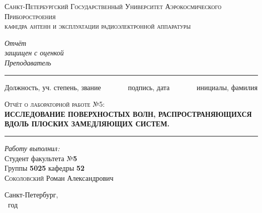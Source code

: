 \newcommand{\HRule}{\rule{\linewidth}{0.5mm}}
\begin{titlepage}
\begin{center}
\textsc{\large Санкт-Петербургский Государственный
Университет Аэрокосмического Приборостроения}\\[2cm]
\textsc{\large кафедра антенн и эксплуатации радиоэлектронной 
 аппаратуры}
\\[2cm]

 \begin{flushleft} \large
  \emph{Отчёт} \\
   \emph{защищен с оценкой}
   \\[0.5cm]
   \emph{Преподаватель}\\[-3mm]
   \HRule
\end{flushleft}
\begin{flushright}
\vspace{-6 pt}
{\small
Должность, уч. степень, звание
\ \ \ \ \ \ \
подпись, дата
\ \ \ \ \ \ \
инициалы, фамилия }\\[10mm]
\end{flushright}

\textsc{\Large Отчёт о лабораторной работе №5:} \\[1cm]
{\Large \bfseries ИССЛЕДОВАНИЕ ПОВЕРХНОСТЫХ ВОЛН,
РАСПРОСТРАНЯЮЩИХСЯ ВДОЛЬ ПЛОСКИХ ЗАМЕДЛЯЮЩИХ СИСТЕМ.}\\[1cm]

\HRule
\vspace{5 pt}
\begin{flushright}
    \begin{minipage}{0.5\textwidth}
        \begin{flushright} 
            \large
            \emph{Работу выполнил:}\\
            Студент факультета №\textbf{5}\\
            Группы \textbf{5025} кафедры \textbf{52}\\[2pt]
            \textsc{Соколовский} \textsc{Р}оман \textsc{А}лександрович
        \end{flushright}
    \end{minipage}
\end{flushright}

\vfill
Санкт-Петербург,\\
\the\year~год
\end{center}
\end{titlepage}
